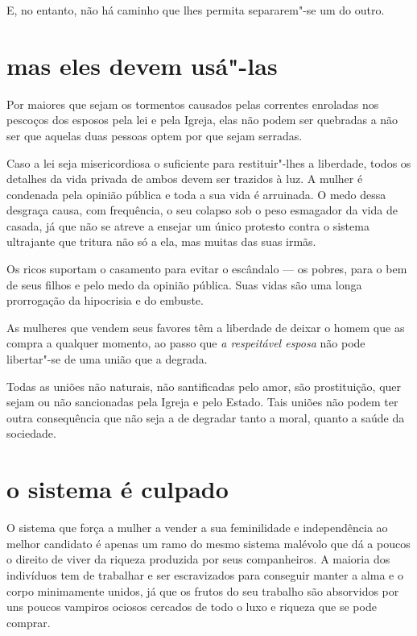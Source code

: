 E, no entanto, não há caminho que lhes permita separarem"-se um do outro.

\section{mas eles devem usá"-las}

Por maiores que sejam os tormentos causados pelas correntes
enroladas nos pescoços dos esposos pela lei e pela Igreja, elas não podem ser quebradas
a não ser que aquelas duas pessoas optem por que sejam serradas.

Caso a lei seja misericordiosa o suficiente para restituir"-lhes a liberdade,
todos os detalhes da vida privada de ambos devem ser
trazidos à luz. A mulher é condenada pela opinião pública e toda a sua
vida é arruinada. O medo dessa desgraça causa, com frequência, o
seu colapso sob o peso esmagador da vida de casada, já que não se atreve
a ensejar um único protesto contra o sistema ultrajante que tritura não
só a ela, mas muitas das suas irmãs.

Os ricos suportam o casamento para evitar o escândalo --- os pobres, para
o bem de seus filhos e pelo medo da opinião pública. Suas vidas são uma
longa prorrogação da hipocrisia e do embuste.

As mulheres que vendem seus favores têm a liberdade de deixar o homem
que as compra a qualquer momento, ao passo que \textit{a respeitável esposa}
não pode libertar"-se de uma união que a degrada.

Todas as uniões não naturais, não santificadas pelo amor, são
prostituição, quer sejam ou não sancionadas pela Igreja e pelo Estado.
Tais uniões não podem ter outra consequência que não seja a de degradar
tanto a moral, quanto a saúde da sociedade.

\section{o sistema é culpado}

O sistema que força a mulher a vender a sua feminilidade e independência\label{sistema}
ao melhor candidato é apenas um ramo do mesmo sistema malévolo que dá a poucos
o direito de viver da riqueza produzida por seus companheiros. A maioria dos indivíduos tem de 
trabalhar e ser escravizados para
conseguir manter a alma e o corpo minimamente unidos, já que os frutos
do seu trabalho são absorvidos por uns poucos vampiros ociosos cercados
de todo o luxo e riqueza que se pode comprar.

